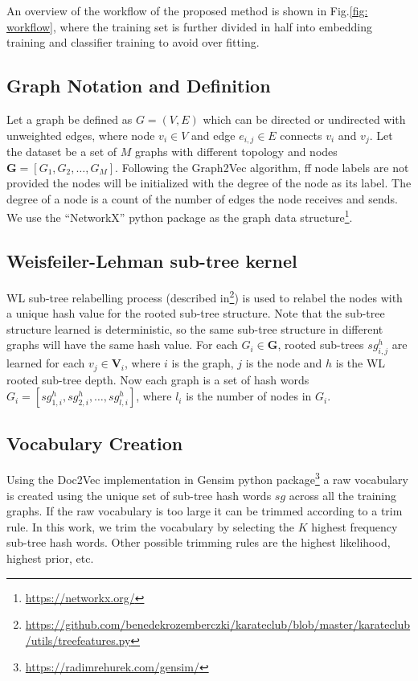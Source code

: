 An overview of the workflow of the proposed method is shown in Fig.\ref{fig: workflow}, where the training set is further divided in half into embedding training and classifier training to avoid over fitting.

\subsection{Graph Notation and Definition}
Let a graph be defined as $G = (V, E)$ which can be directed or undirected with unweighted edges, where node $v_i \in V$ and edge $e_{i,j} \in E$ connects $v_i$ and $v_j$. Let the dataset be a set of $M$ graphs with different topology and nodes $\mathbf{G} = [G_1, G_2, \dots, G_M]$. Following the Graph2Vec algorithm, ff node labels are not provided the nodes will be initialized with the degree of the node as its label. The degree of a node is a count of the number of edges the node receives and sends. We use the ``NetworkX'' python package as the graph data structure\footnote{\url{https://networkx.org/}}.

\subsection{Weisfeiler-Lehman sub-tree  kernel}

WL sub-tree relabelling process (described in\cite{shervashidze2011weisfeiler}\footnote{\url{https://github.com/benedekrozemberczki/karateclub/blob/master/karateclub/utils/treefeatures.py}}) is used to relabel the nodes with a unique hash value for the rooted sub-tree structure. Note that the sub-tree structure learned is deterministic, so the same sub-tree structure in different graphs will have the same hash value. For each $G_i \in \mathbf{G}$, rooted sub-trees $sg_{i,j}^h$ are learned for each $v_j \in \mathbf{V}_i$, where $i$ is the graph, $j$ is the node and $h$ is the WL rooted sub-tree depth. Now each graph is a set of hash words $G_i = [sg_{1,i}^h, sg_{2,i}^h, \dots, sg_{l,i}^h]$, where $l_i$ is the number of nodes in $G_i$.

\subsection{Vocabulary Creation}
Using the Doc2Vec implementation in Gensim python package\footnote{\url{https://radimrehurek.com/gensim/}} a raw vocabulary is created using the unique set of sub-tree hash words $sg$ across all the training graphs\cite{Le2014}. If the raw vocabulary is too large it can be trimmed according to a trim rule. In this work, we trim the vocabulary by selecting the $K$ highest frequency sub-tree hash words. Other possible trimming rules are the highest likelihood, highest prior, etc. 

